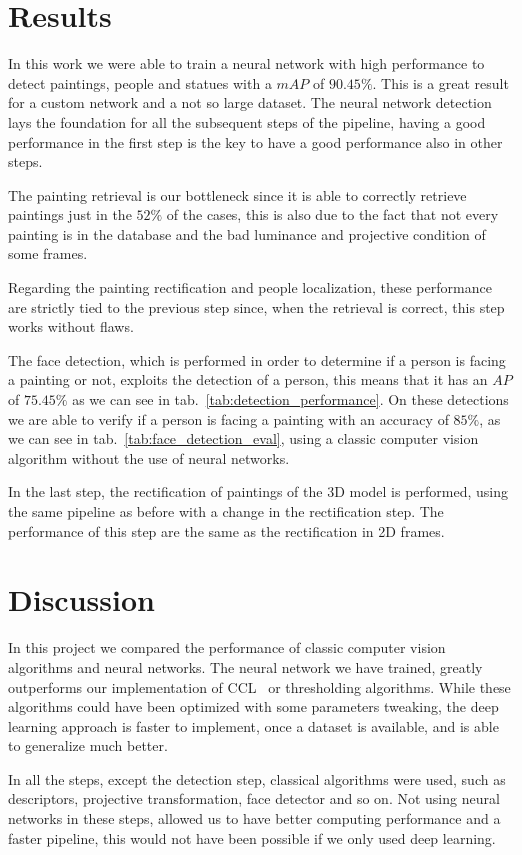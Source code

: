 \section{Results}
In this work we were able to train a neural network with high performance to detect paintings, people and statues with a $mAP$ of $90.45\%$. This is a great result for a custom network and a not so large dataset. The neural network detection lays the foundation for all the subsequent steps of the pipeline, having a good performance in the first step is the key to have a good performance also in other steps.

The painting retrieval is our bottleneck since it is able to correctly retrieve paintings just in the $52\%$ of the cases, this is also due to the fact that not every painting is in the database and the bad luminance and projective condition of some frames.

Regarding the painting rectification and people localization, these performance are strictly tied to the previous step since, when the retrieval is correct, this step works without flaws.

The face detection, which is performed in order to determine if a person is facing a painting or not, exploits the detection of a person, this means that it has an $AP$ of $75.45\%$ as we can see in tab.~\ref{tab:detection_performance}. On these detections we are able to verify if a person is facing a painting with an accuracy of $85\%$, as we can see in tab.~\ref{tab:face_detection_eval}, using a classic computer vision algorithm without the use of neural networks.

In the last step, the rectification of paintings of the 3D model is performed, using the same pipeline as before with a change in the rectification step. The performance of this step are the same as the rectification in 2D frames.

\section{Discussion}
In this project we compared the performance of classic computer vision algorithms and neural networks. The neural network we have trained, greatly outperforms our implementation of CCL~\cite{Grana_ccl} or thresholding algorithms. While these algorithms could have been optimized with some parameters tweaking, the deep learning approach is faster to implement, once a dataset is available, and is able to generalize much better.

In all the steps, except the detection step, classical algorithms were used, such as descriptors, projective transformation, face detector and so on. Not using neural networks in these steps, allowed us to have better computing performance and a faster pipeline, this would not have been possible if we only used deep learning.

